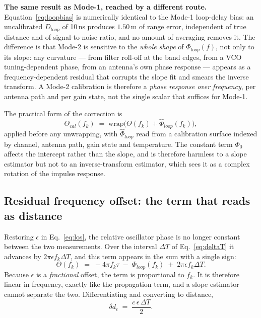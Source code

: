 \documentclass[11pt,a4paper]{article}
\begin{document}
\begin{callout}
\textbf{The same result as Mode-1, reached by a different route.} Equation~\eqref{eq:loopbias} is
numerically identical to the Mode-1 loop-delay bias: an uncalibrated $D_{loop}$ of 10\,ns produces
$1.50$\,m of range error, independent of true distance and of signal-to-noise ratio, and no amount
of averaging removes it. The difference is that Mode-2 is sensitive to the \emph{whole shape} of
$\Phi_{loop}(f)$, not only to its slope: any curvature --- from filter roll-off at the band edges,
from a VCO tuning-dependent phase, from an antenna's own phase response --- appears as a
frequency-dependent residual that corrupts the slope fit and smears the inverse transform. A Mode-2
calibration is therefore a \emph{phase response over frequency}, per antenna path and per gain state,
not the single scalar that suffices for Mode-1.
\end{callout}

The practical form of the correction is
\begin{equation}
\Theta_{cal}(f_k) \;=\; \mathrm{wrap}\bigl(\Theta(f_k) + \hat\Phi_{loop}(f_k)\bigr),
\label{eq:phasecal}
\end{equation}
applied before any unwrapping, with $\hat\Phi_{loop}$ read from a calibration surface indexed by
channel, antenna path, gain state and temperature. The constant term $\Phi_0$ affects the intercept
rather than the slope, and is therefore harmless to a slope estimator but not to an
inverse-transform estimator, which sees it as a complex rotation of the impulse response.

\subsection{Residual frequency offset: the term that reads as distance}
\label{sec:freqerr}

Restoring $\epsilon$ in Eq.~\eqref{eq:los}, the relative oscillator phase is no longer constant
between the two measurements. Over the interval $\Delta T$ of Eq.~\eqref{eq:deltaT} it advances by
$2\pi \epsilon f_k \Delta T$, and this term appears in the sum with a single sign:
\begin{equation}
\Theta(f_k) \;=\; -4\pi f_k \tau \;-\; \Phi_{loop}(f_k) \;+\; 2\pi \epsilon f_k \Delta T .
\label{eq:epsterm}
\end{equation}
Because $\epsilon$ is a \emph{fractional} offset, the term is proportional to $f_k$. It is therefore
linear in frequency, exactly like the propagation term, and a slope estimator cannot separate the
two. Differentiating and converting to distance,
\begin{equation}
\delta d_\epsilon \;=\; \frac{c\,\epsilon\,\Delta T}{2} .
\label{eq:epsbias}
\end{equation}
\end{document}
